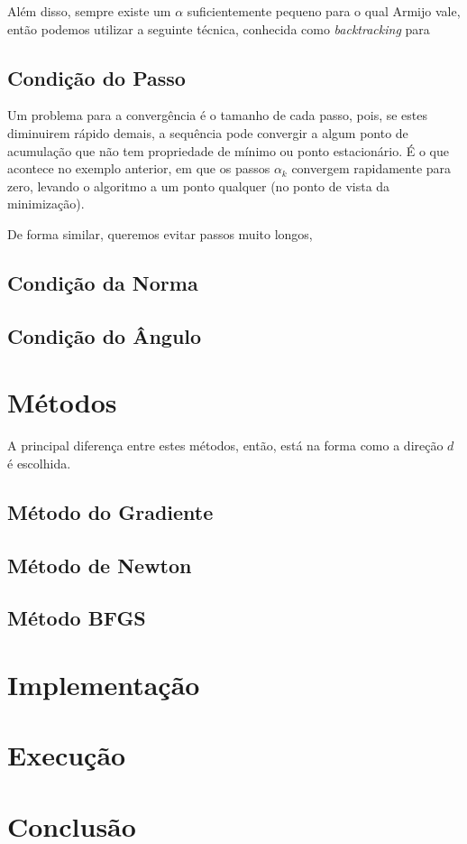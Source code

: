 \documentclass[a4paper,11pt]{article}
\begin{document}
            Além disso, sempre existe um $\alpha$ suficientemente pequeno para o qual Armijo vale, então podemos utilizar
            a seguinte técnica, conhecida como \emph{backtracking} para 
        \subsection*{Condição do Passo}
            Um problema para a convergência é o tamanho de cada passo, pois, se estes diminuirem rápido demais, a sequência pode
            convergir a algum ponto de acumulação que não tem propriedade de mínimo ou ponto estacionário. É o que acontece
            no exemplo anterior, em que os passos $\alpha_k$ convergem rapidamente para zero, levando o algoritmo a um ponto
            qualquer (no ponto de vista da minimização).

            De forma similar, queremos evitar passos muito longos,

        \subsection*{Condição da Norma}
        \subsection*{Condição do Ângulo}
    \section*{Métodos}
        A principal diferença entre estes métodos, então, está na forma como a direção $d$ é escolhida.

        \subsection*{Método do Gradiente}
        \subsection*{Método de Newton}
        \subsection*{Método BFGS}
    \section*{Implementação}
    \section*{Execução}
    \section*{Conclusão}
\end{document}
